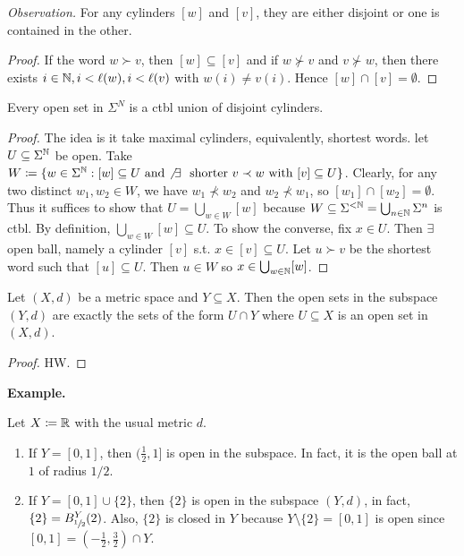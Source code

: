\documentclass[14pt,oneside]{extarticle}
\newenvironment{example}{
    \par
    \vspace{5pt}
    \noindent\textbf{Example.}
    \begin{tcolorbox}[
        blanker, breakable, left=5mm, parbox=false,
        before upper={\parindent15pt},
        after skip=10pt,
        borderline west={1mm}{0pt}{solarized-magenta!50}]
}{
    \end{tcolorbox}
    \vspace{5pt}
}
\begin{document}
\textit{Observation.} For any cylinders $[w]$ and $[v]$, they are either disjoint or one is contained in the other.
\begin{proof}
  If the word $w \succ v$, then $[w] \subseteq [v]$ and if $w \not\succ v$ and $v \not\succ w$, then there exists $i \in \mathbb{N}, i < \ell(w), i < \ell(v)$ with $w(i) \neq v(i)$. Hence $[w] \cap [v] = \emptyset$.
\end{proof}

\begin{proposition*}
  Every open set in $\Sigma^N$ is a ctbl union of disjoint cylinders.
\end{proposition*}
\begin{proof}
  The idea is it take maximal cylinders, equivalently, shortest words. let $U \subseteq \Sigma^{\mathbb{N}}$ be open. Take $W \coloneqq \{w \in \Sigma^\N: [w] \subseteq U \text{ and $\not\exists \,$ shorter $v \prec w$ with $[v] \subseteq U$}\}$. Clearly, for any two distinct $w_1, w_2 \in W$, we have $w_1 \not\prec w_2$ and $w_2 \not\prec w_1$, so $[w_1] \cap [w_2] = \emptyset$. Thus it suffices to show that $U = \bigcup_{w \in W} [w]$ because $W \subseteq \Sigma^{<\mathbb{N}} = \bigcup_{n \in \mathbb{N}}\Sigma^n$ is ctbl. By definition, $ \bigcup_{w \in W} [w] \subseteq U$. To show the converse, fix $x \in U$. Then $\exists \,$ open ball, namely a cylinder $[v]$ s.t. $x \in [v] \subseteq U$. Let $u \succ v$ be the shortest word such that $[u] \subseteq U$. Then $u \in W$ so $x \in \bigcup_{w \in \mathbb{N}}[w]$.
\end{proof}

\begin{proposition*}
  Let $(X,d)$ be a metric space and $Y \subseteq X$. Then the open sets in the subspace $(Y,d)$ are exactly the sets of the form $U \cap Y$ where $U \subseteq X$ is an open set in $(X,d)$.
\end{proposition*}
\begin{proof}
  HW.
\end{proof}

\begin{example} 
  Let $X \coloneqq \mathbb{R}$ with the usual metric $d$.
  \begin{enumerate}[label=$\circ$, leftmargin=*, itemsep=1em]
    \item If $Y = [0,1]$, then $(\frac{1}{2}, 1]$ is open in the subspace. In fact, it is the open ball at $1$ of radius $1/2$.
    \item If $Y = [0,1] \cup \{2\}$, then $\{2\}$ is open in the subspace $(Y,d)$, in fact, $\{2\} = B_{\sfrac{1}{2}}^Y(2)$. Also, $\{2\}$ is closed in $Y$ because $Y \setminus \{2\} = [0,1]$ is open since $[0,1] = \left(-\frac{1}{2}, \frac{3}{2}\right) \cap Y$.
  \end{enumerate}
\end{example}
\end{document}
